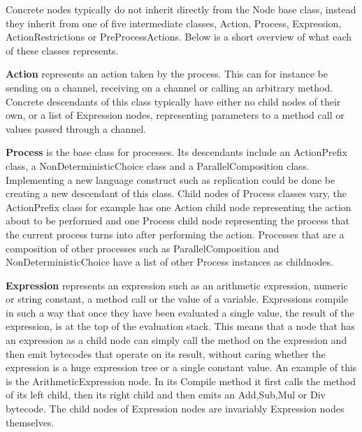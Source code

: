 	Concrete nodes typically do not inherit directly from the \textsf{Node} base 
	class, instead they inherit from one of five intermediate classes, 
	\textsf{Action}, \textsf{Process}, \textsf{Expression}, 
	\textsf{ActionRestrictions} or \textsf{PreProcessActions}. Below is a short 
	overview of what each of these classes represents.
	
	\textbf{Action} represents an action taken by the 
	process. This can for instance be sending on a channel, receiving on a 
	channel or calling an arbitrary method. Concrete descendants of this class 
	typically have either no child nodes of their own, or a list of 
	\textsf{Expression} nodes, representing parameters to a method call or 
	values passed through a channel.

	\textbf{Process} is the base class for processes. Its descendants include an 
	\textsf{ActionPrefix} class, a \textsf{NonDeterministicChoice} class and a 
	\textsf{ParallelComposition} class. Implementing a new language construct 
	such as replication could be done be creating a new descendant of this 
	class. Child nodes of \textsf{Process} classes vary, the 
	\textsf{ActionPrefix} class for example has one \textsf{Action} child node 
	representing the action about to be performed and one \textsf{Process} child 
	node representing the process that the current process turns into after 
	performing the action. Processes that are a composition of other processes 
	such as \textsf{ParallelComposition} and \textsf{NonDeterministicChoice} 
	have a list of other \textsf{Process} instances as childnodes.
	
	\textbf{Expression} represents an expression such as an arithmetic 
	expression, numeric or string constant, a method call or the value of a 
	variable.	Expressions compile in such a way that once they have been 
	evaluated a single value, the result of the expression, is at the top of the 
	evaluation stack. This means that a node that has an expression as a child 
	node can simply call the  method on the expression and then 
	emit bytecodes that operate on its result, without caring whether the 
	expression is a huge expression tree or a single constant value. An example 
	of this is the \textsf{ArithmeticExpression} node. In its \textsf{Compile} 
	method it first calls the  method of its left child, then 
	its right child and then emits an \textsf{Add},\textsf{Sub},\textsf{Mul} or 
	\textsf{Div} bytecode. The child nodes of \textsf{Expression} nodes are 
	invariably \textsf{Expression} nodes themselves.

